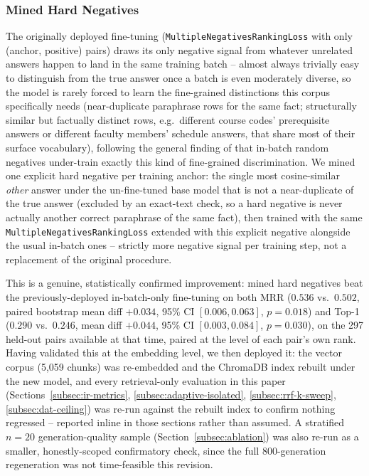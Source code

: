 \documentclass[a4paper,twoside]{article}
\begin{document}
\subsubsection{Mined Hard Negatives}
\label{subsec:hard-negatives}

The originally deployed fine-tuning (\texttt{MultipleNegativesRankingLoss} with only (anchor, positive) pairs) draws its only negative signal from whatever unrelated answers happen to land in the same training batch -- almost always trivially easy to distinguish from the true answer once a batch is even moderately diverse, so the model is rarely forced to learn the fine-grained distinctions this corpus specifically needs (near-duplicate paraphrase rows for the same fact; structurally similar but factually distinct rows, e.g.\ different course codes' prerequisite answers or different faculty members' schedule answers, that share most of their surface vocabulary), following the general finding of \citet{meghwani2025hardneg} that in-batch random negatives under-train exactly this kind of fine-grained discrimination. We mined one explicit hard negative per training anchor: the single most cosine-similar \emph{other} answer under the un-fine-tuned base model that is not a near-duplicate of the true answer (excluded by an exact-text check, so a hard negative is never actually another correct paraphrase of the same fact), then trained with the same \texttt{MultipleNegativesRankingLoss} extended with this explicit negative alongside the usual in-batch ones -- strictly more negative signal per training step, not a replacement of the original procedure.

This is a genuine, statistically confirmed improvement: mined hard negatives beat the previously-deployed in-batch-only fine-tuning on both MRR ($0.536$ vs.\ $0.502$, paired bootstrap mean diff $+0.034$, 95\% CI $[0.006, 0.063]$, $p=0.018$) and Top-1 ($0.290$ vs.\ $0.246$, mean diff $+0.044$, 95\% CI $[0.003, 0.084]$, $p=0.030$), on the 297 held-out pairs available at that time, paired at the level of each pair's own rank. Having validated this at the embedding level, we then deployed it: the vector corpus (5{,}059 chunks) was re-embedded and the ChromaDB index rebuilt under the new model, and every retrieval-only evaluation in this paper (Sections~\ref{subsec:ir-metrics}, \ref{subsec:adaptive-isolated}, \ref{subsec:rrf-k-sweep}, \ref{subsec:dat-ceiling}) was re-run against the rebuilt index to confirm nothing regressed -- reported inline in those sections rather than assumed. A stratified $n=20$ generation-quality sample (Section~\ref{subsec:ablation}) was also re-run as a smaller, honestly-scoped confirmatory check, since the full 800-generation regeneration was not time-feasible this revision.
\end{document}
